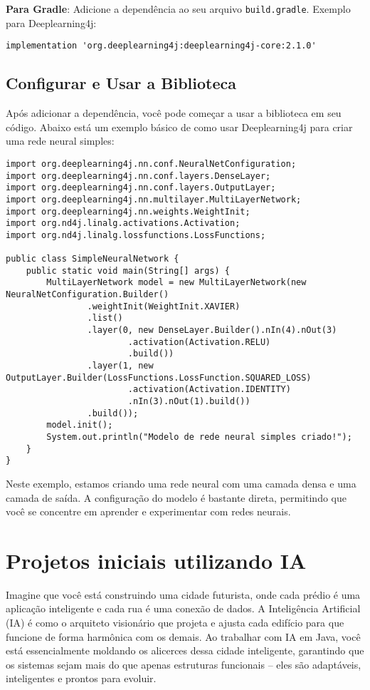 \documentclass[a4paper,12pt]{book}
\begin{document}
\textbf{Para Gradle}:
Adicione a dependência ao seu arquivo \texttt{build.gradle}. Exemplo para Deeplearning4j:

\begin{verbatim}
implementation 'org.deeplearning4j:deeplearning4j-core:2.1.0'
\end{verbatim}

\subsection{Configurar e Usar a Biblioteca}

Após adicionar a dependência, você pode começar a usar a biblioteca em seu código. Abaixo está um exemplo básico de como usar Deeplearning4j para criar uma rede neural simples:

\begin{verbatim}
import org.deeplearning4j.nn.conf.NeuralNetConfiguration;
import org.deeplearning4j.nn.conf.layers.DenseLayer;
import org.deeplearning4j.nn.conf.layers.OutputLayer;
import org.deeplearning4j.nn.multilayer.MultiLayerNetwork;
import org.deeplearning4j.nn.weights.WeightInit;
import org.nd4j.linalg.activations.Activation;
import org.nd4j.linalg.lossfunctions.LossFunctions;

public class SimpleNeuralNetwork {
    public static void main(String[] args) {
        MultiLayerNetwork model = new MultiLayerNetwork(new NeuralNetConfiguration.Builder()
                .weightInit(WeightInit.XAVIER)
                .list()
                .layer(0, new DenseLayer.Builder().nIn(4).nOut(3)
                        .activation(Activation.RELU)
                        .build())
                .layer(1, new OutputLayer.Builder(LossFunctions.LossFunction.SQUARED_LOSS)
                        .activation(Activation.IDENTITY)
                        .nIn(3).nOut(1).build())
                .build());
        model.init();
        System.out.println("Modelo de rede neural simples criado!");
    }
}
\end{verbatim}

Neste exemplo, estamos criando uma rede neural com uma camada densa e uma camada de saída. A configuração do modelo é bastante direta, permitindo que você se concentre em aprender e experimentar com redes neurais.

\section{Projetos iniciais utilizando IA}
Imagine que você está construindo uma cidade futurista, onde cada prédio é uma aplicação inteligente e cada rua é uma conexão de dados. A Inteligência Artificial (IA) é como o arquiteto visionário que projeta e ajusta cada edifício para que funcione de forma harmônica com os demais. Ao trabalhar com IA em Java, você está essencialmente moldando os alicerces dessa cidade inteligente, garantindo que os sistemas sejam mais do que apenas estruturas funcionais – eles são adaptáveis, inteligentes e prontos para evoluir.
\end{document}
